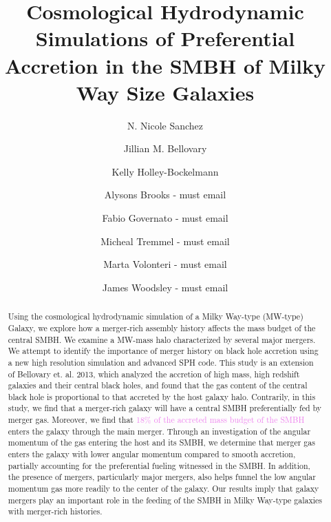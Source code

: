 \documentclass[manuscript]{aastex}
\begin{document}
 

\title{Cosmological Hydrodynamic Simulations of Preferential Accretion in the SMBH of Milky Way Size Galaxies}



\author{N. Nicole Sanchez }
\author{Jillian M. Bellovary}
\author{Kelly Holley-Bockelmann}
\author{Alysons Brooks - must email}
\author{Fabio Governato - must email}
\author{Micheal Tremmel - must email}
\author{Marta Volonteri - must email}
\author{James Woodsley - must email}




\begin{abstract}\label{abs:abstractlabel}

Using the cosmological hydrodynamic simulation of a Milky Way-type (MW-type) Galaxy, we explore how a merger-rich assembly history affects the mass budget of the central SMBH. We examine a MW-mass halo characterized by several major mergers. We attempt to identify the importance of merger history on black hole accretion using a new high resolution simulation and advanced SPH code. This study is an extension of Bellovary et. al. 2013, which analyzed the accretion of high mass, high redshift galaxies and their central black holes, and found that the gas content of the central black hole is proportional to that accreted by the host galaxy halo. Contrarily, in this study, we find that a merger-rich galaxy will have a central SMBH preferentially fed by merger gas. Moreover, we find that \textcolor{violet}{18\% of the accreted mass budget of the SMBH} enters the galaxy through the main merger. Through an investigation of the angular momentum of the gas entering the host and its SMBH, we determine that merger gas enters the galaxy with lower angular momentum compared to smooth accretion, partially accounting for the preferential fueling witnessed in the SMBH. In addition, the presence of mergers, particularly major mergers, also helps funnel the low angular momentum gas more readily to the center of the galaxy. Our results imply that galaxy mergers play an important role in the feeding of the SMBH in Milky Way-type galaxies with merger-rich histories.

\end{abstract}
\end{document}
